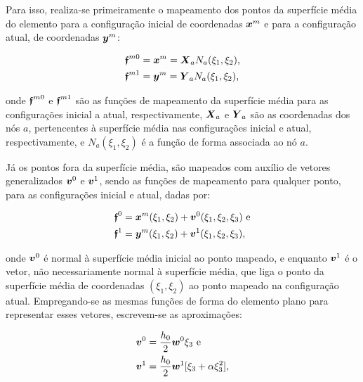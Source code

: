 Para isso, realiza-se primeiramente o mapeamento dos pontos da superfície média do elemento para a configuração inicial de coordenadas $\boldsymbol{x}^m$ e para a configuração atual, de coordenadas $\boldsymbol{y}^m$:

\begin{subequations}
    \begin{align}
         & \boldsymbol{\mathfrak{f}}^{m0}=\boldsymbol{x}^m=\boldsymbol{X}_aN_a(\xi_1,\xi_2)\text{,} \\
         & \boldsymbol{\mathfrak{f}}^{m1}=\boldsymbol{y}^m=\boldsymbol{Y}_aN_a(\xi_1,\xi_2)\text{,}
    \end{align}
\end{subequations}

\noindent onde $\boldsymbol{\mathfrak{f}}^{m0}$ e $\boldsymbol{\mathfrak{f}}^{m1}$ são as funções de mapeamento da superfície média para as configurações inicial a atual, respectivamente, $\boldsymbol{X}_a$ e $\boldsymbol{Y}_a$ são as coordenadas dos nós $a$, pertencentes à superfície média nas configurações inicial e atual, respectivamente, e $N_a(\xi_1,\xi_2)$ é a função de forma associada ao nó $a$.

Já os pontos fora da superfície média, são mapeados com auxílio de vetores generalizados $\boldsymbol{v}^0$ e $\boldsymbol{v}^1$, sendo as funções de mapeamento para qualquer ponto, para as configurações inicial e atual, dadas por:

\begin{subequations}
    \begin{align}
         & \boldsymbol{\mathfrak{f}}^0=\boldsymbol{x}^m(\xi_1,\xi_2)+\boldsymbol{v}^0(\xi_1,\xi_2,\xi_3)\text{ e} \\
         & \boldsymbol{\mathfrak{f}}^1=\boldsymbol{y}^m(\xi_1,\xi_2)+\boldsymbol{v}^1(\xi_1,\xi_2,\xi_3)\text{,}
    \end{align}
\end{subequations}

\noindent onde $\boldsymbol{v}^0$ é normal à superfície média inicial ao ponto mapeado, e enquanto $\boldsymbol{v}^1$ é o vetor, não necessariamente normal à superfície média, que liga o ponto da superfície média de coordenadas $(\xi_1,\xi_2)$ ao ponto mapeado na configuração atual. Empregando-se as mesmas funções de forma do elemento plano para representar esses vetores, escrevem-se as aproximações:

\begin{subequations}
    \begin{align}
         & \boldsymbol{v}^0=\frac{h_0}{2}\boldsymbol{w}^0\xi_3\text{ e}                \\
         & \boldsymbol{v}^1=\frac{h_0}{2}\boldsymbol{w}^1[\xi_3+\alpha\xi_3^2]\text{,}
    \end{align}
\end{subequations}

